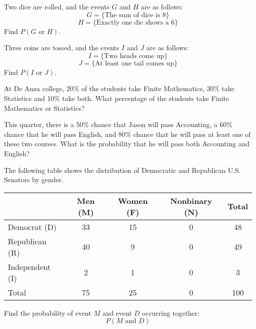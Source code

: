 \begin{puzzle}
    Two dice are rolled, and the events \( G \) and \( H \) are as follows:
    \[ G = \{\text{The sum of dice is 8}\}\]
    \[ H = \{\text{Exactly one die shows a 6}\}\]
    Find \( P(G \text{ or } H) \).
\end{puzzle}

\begin{puzzle}
    Three coins are tossed, and the events \( I \) and \( J \) are as follows:
    \[ I = \{\text{Two heads come up}\}\]
    \[ J = \{\text{At least one tail comes up}\}\]
    Find \( P(I \text{ or } J) \).
\end{puzzle}


\begin{puzzle}
    At De Anza college, 20\% of the students take Finite Mathematics, 30\% take Statistics and 10\% take both. What percentage of the students take Finite Mathematics or Statistics?
\end{puzzle}

\begin{puzzle}
    This quarter, there is a 50\% chance that Jason will pass Accounting, a 60\% chance that he will
    pass English, and 80\% chance that he will pass at least one of these two courses. What is the
    probability that he will pass both Accounting and English?
\end{puzzle}

The following table shows the distribution of Democratic and Republican U.S. Senators by gender.
\begin{center}
    \begin{tabular}{|l|c|c|c|c|}
        \hline
                        & Men (M) & Women (F) & Nonbinary (N) & Total \\ \hline
        Democrat (D)    & 33      & 15        & 0             & 48    \\
        Republican (R)  & 40      & 9         & 0             & 49    \\
        Independent (I) & 2       & 1         & 0             & 3     \\
        Total           & 75      & 25        & 0             & 100   \\ \hline
    \end{tabular}
\end{center}

\begin{puzzle}
    Find the probability of event \( M \) and event \( D \) occurring together:
    \[ P(M \text{ and } D) \]
\end{puzzle}

